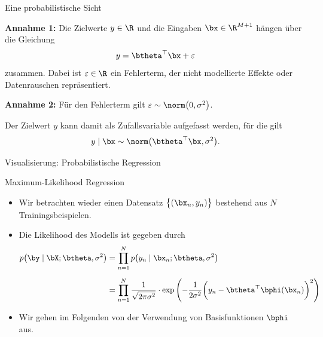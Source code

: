 \begin{frame}{Eine probabilistische Sicht}{}
	\begin{boxGray}
		\textbf{Annahme 1:} Die Zielwerte $y \in \R$ und die Eingaben $\bx \in \R^{M+1}$ hängen über die Gleichung
		\begin{equation}
			y = \btheta^\top \bx + \varepsilon
		\end{equation}
		zusammen. Dabei ist $\varepsilon \in \R$ ein Fehlerterm, der nicht modellierte Effekte oder Datenrauschen repräsentiert.
	\end{boxGray}
	
	\begin{boxGray}
		\textbf{Annahme 2:} Für den Fehlerterm gilt $\varepsilon \sim \norm\bigl( 0, \sigma^2 \bigr)$.
	\end{boxGray}

	Der Zielwert $y$ kann damit als Zufallsvariable aufgefasst werden, für die gilt
	\begin{equation}
		y \mid \bx \sim \norm\bigl(\btheta^\top \bx, \sigma^2 \bigr).
	\end{equation}
\end{frame}


\begin{frame}{Visualisierung: Probabilistische Regression}{}
	
\end{frame}


\begin{frame}{Maximum-Likelihood Regression}{}
	\begin{itemize}
		\item Wir betrachten wieder einen Datensatz $\bigl\{ (\bx_n, y_n) \bigr\}$ bestehend aus $N$ Trainingsbeispielen.
		\item Die Likelihood des Modells ist gegeben durch
		\begin{equation}
			\label{eq:reg-likelihood}
			\begin{aligned}
				p\bigl( \by \mid \bX; \btheta, \sigma^2 \bigr)
					&= \prod_{n=1}^N p\bigl( y_n \mid \bx_n; \btheta, \sigma^2 \bigr)
			\\[2mm]
					&= \prod_{n=1}^N \frac{1}{\sqrt{2 \pi \sigma^2}} \cdot \exp\left(
						-\frac{1}{2 \sigma^2} \biggl( y_n - \btheta^\top \bphi(\bx_n) \biggr)^2
					\right)
			\end{aligned}
		\end{equation}
		\item Wir gehen im Folgenden von der Verwendung von Basisfunktionen $\bphi$ aus.
	\end{itemize}
\end{frame}



